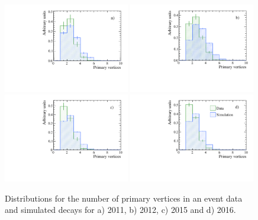 \begin{figure}[tbp]
  \centering
    \includegraphics[width=0.49\textwidth]{./Figs/LifetimeSystematics/nPVs_2011_new.pdf}
    \includegraphics[width=0.49\textwidth]{./Figs/LifetimeSystematics/nPVs_2012_new.pdf}
    \includegraphics[width=0.49\textwidth]{./Figs/LifetimeSystematics/nPVs_2015_new.pdf}
    \includegraphics[width=0.49\textwidth]{./Figs/LifetimeSystematics/nPVs_2016_new.pdf}
  \caption{Distributions for the number of primary vertices in an event \bdkpi data and simulated decays for a) 2011, b) 2012, c) 2015 and d) 2016.}%
  \label{fig:Bd2KPi_nPVs_MC_data_comparison}
\end{figure}


